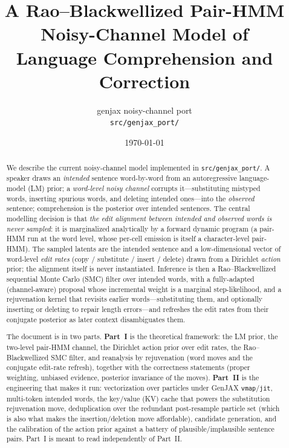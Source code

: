 \documentclass[11pt]{article}
\title{A Rao--Blackwellized Pair-HMM Noisy-Channel Model of\\
Language Comprehension and Correction}
\author{genjax noisy-channel port \\ \small \texttt{src/genjax\_port/}}
\date{\today}
\providecommand{\code}[1]{\texttt{#1}}
\begin{document}
\maketitle

\begin{abstract}
We describe the current noisy-channel model implemented in \code{src/genjax\_port/}. A speaker draws an \emph{intended} sentence word-by-word from an autoregressive language-model (LM) prior; a \emph{word-level noisy channel} corrupts it---substituting mistyped words, inserting spurious words, and deleting intended ones---into the \emph{observed} sentence; comprehension is the posterior over intended sentences. The central modelling decision is that \emph{the edit alignment between intended and observed words is never sampled}: it is marginalized analytically by a forward dynamic program (a pair-HMM run at the word level, whose per-cell emission is itself a character-level pair-HMM). The sampled latents are the intended sentence and a low-dimensional vector of word-level \emph{edit rates} (copy / substitute / insert / delete) drawn from a Dirichlet \emph{action} prior; the alignment itself is never instantiated. Inference is then a Rao--Blackwellized sequential Monte Carlo (SMC) filter over intended words, with a fully-adapted (channel-aware) proposal whose incremental weight is a marginal step-likelihood, and a rejuvenation kernel that revisits earlier words---substituting them, and optionally inserting or deleting to repair length errors---and refreshes the edit rates from their conjugate posterior as later context disambiguates them.

The document is in two parts. \textbf{Part~I} is the theoretical framework: the LM prior, the two-level pair-HMM channel, the Dirichlet action prior over edit rates, the Rao--Blackwellized SMC filter, and reanalysis by rejuvenation (word moves and the conjugate edit-rate refresh), together with the correctness statements (proper weighting, unbiased evidence, posterior invariance of the moves). \textbf{Part~II} is the engineering that makes it run: vectorization over particles under GenJAX \code{vmap}/\code{jit}, multi-token intended words, the key/value (KV) cache that powers the substitution rejuvenation move, deduplication over the redundant post-resample particle set (which is also what makes the insertion/deletion move affordable), candidate generation, and the calibration of the action prior against a battery of plausible/implausible sentence pairs. Part~I is meant to read independently of Part~II.
\end{abstract}
\end{document}
